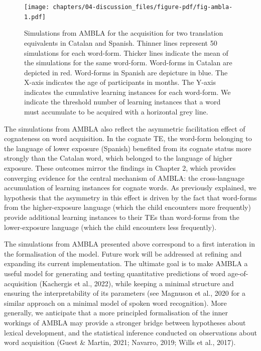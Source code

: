 \documentclass[
  12pt,
  b5paperpaper,
  twoside]{scrreprt}
\begin{document}
\newpage

\begin{figure}

{\centering \texttt{[image: chapters/04-discussion\_files/figure-pdf/fig-ambla-1.pdf]}

}

\caption{\label{fig-ambla}Simulations from AMBLA for the acquisition for
two translation equivalents in Catalan and Spanish. Thinner lines
represent 50 simulations for each word-form. Thicker lines indicate the
mean of the simulations for the same word-form. Word-forms in Catalan
are depicted in red. Word-forms in Spanish are depicture in blue. The
X-axis indicates the age of participants in months. The Y-axis indicates
the cumulative learning instances for each word-form. We indicate the
threshold number of learning instances that a word must accumulate to be
acquired with a horizontal grey line.}

\end{figure}

The simulations from AMBLA also reflect the asymmetric facilitation
effect of cognateness on word acquisition. In the cognate TE, the
word-form belonging to the language of lower exposure (Spanish)
benefited from its cognate status more strongly than the Catalan word,
which belonged to the language of higher exposure. These outcomes mirror
the findings in Chapter 2, which provides converging evidence for the
central mechanism of AMBLA: the cross-language accumulation of learning
instances for cognate words. As previously explained, we hypothesis that
the asymmetry in this effect is driven by the fact that word-forms from
the higher-exposure language (which the child encounters more
frequently) provide additional learning instances to their TEs than
word-forms from the lower-exposure language (which the child encounters
less frequently).

The simulations from AMBLA presented above correspond to a first
interation in the formalisation of the model. Future work will be
addressed at refining and expanding its current implementation. The
ultimate goal is to make AMBLA a useful model for generating and testing
quantitative predictions of word age-of-acquisition (Kachergis et al.,
2022), while keeping a minimal structure and ensuring the
interpretability of its parameters (see Magnuson et al., 2020 for a
similar approach on a minimal model of spoken word recognition). More
generally, we anticipate that a more principled formalisation of the
inner workings of AMBLA may provide a stronger bridge between hypotheses
about lexical development, and the statistical inference conducted on
observations about word acquisition (Guest \& Martin, 2021; Navarro,
2019; Wills et al., 2017).
\end{document}
